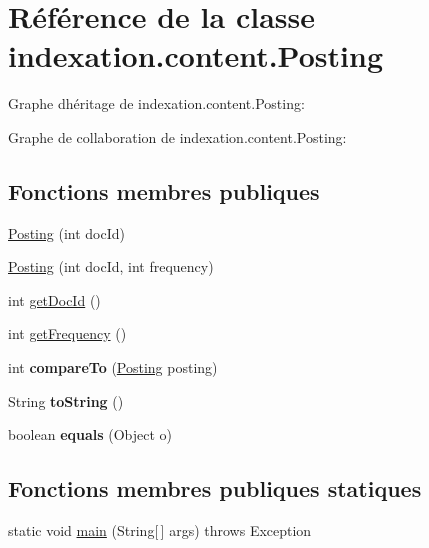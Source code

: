 \hypertarget{classindexation_1_1content_1_1Posting}{}\section{Référence de la classe indexation.\+content.\+Posting}
\label{classindexation_1_1content_1_1Posting}


Graphe d\textquotesingle{}héritage de indexation.\+content.\+Posting\+:


Graphe de collaboration de indexation.\+content.\+Posting\+:
\subsection*{Fonctions membres publiques}
\begin{DoxyCompactItemize}
\item 
\hyperlink{classindexation_1_1content_1_1Posting_a3f69124d394ca8dba1dd17e9ffd025cd}{Posting} (int doc\+Id)
\item 
\hyperlink{classindexation_1_1content_1_1Posting_a5e496e0ae1259f6c32b1c1e41d5f97e0}{Posting} (int doc\+Id, int frequency)
\item 
int \hyperlink{classindexation_1_1content_1_1Posting_a28e341b0a61e7bf6beaa3af24f90af29}{get\+Doc\+Id} ()
\item 
int \hyperlink{classindexation_1_1content_1_1Posting_ae5d70192b6076e0832f4a19a0346fbbb}{get\+Frequency} ()
\item 
\mbox{\label{classindexation_1_1content_1_1Posting_a488e4c92b863f005b9a029402c07891b}} 
int {\bfseries compare\+To} (\hyperlink{classindexation_1_1content_1_1Posting}{Posting} posting)
\item 
\mbox{\label{classindexation_1_1content_1_1Posting_a45ca4379eebb4fb1acba7fde82ef8f18}} 
String {\bfseries to\+String} ()
\item 
\mbox{\label{classindexation_1_1content_1_1Posting_a9f16fb27b71047e5f5fcd13f1d6e0bac}} 
boolean {\bfseries equals} (Object o)
\end{DoxyCompactItemize}
\subsection*{Fonctions membres publiques statiques}
\begin{DoxyCompactItemize}
\item 
static void \hyperlink{classindexation_1_1content_1_1Posting_ac2aea89ea4c889116561a86b6aa0a11b}{main} (String\mbox{[}$\,$\mbox{]} args)  throws Exception  	
\end{DoxyCompactItemize}


